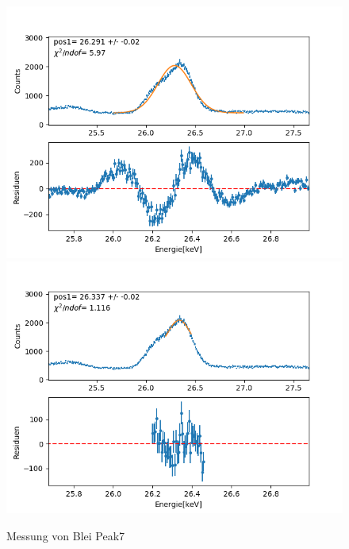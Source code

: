 \documentclass[12pt,a4paper]{article}
\begin{document}
\begin{figure}[H]
\centering
\includegraphics[scale=0.49]{Bilder/roentgen_spektren/blei/pb7_1.png}
\includegraphics[scale=0.49]{Bilder/roentgen_spektren/blei/pb7_2.png}
\caption{Messung von Blei Peak7}
\end{figure}
\end{document}
